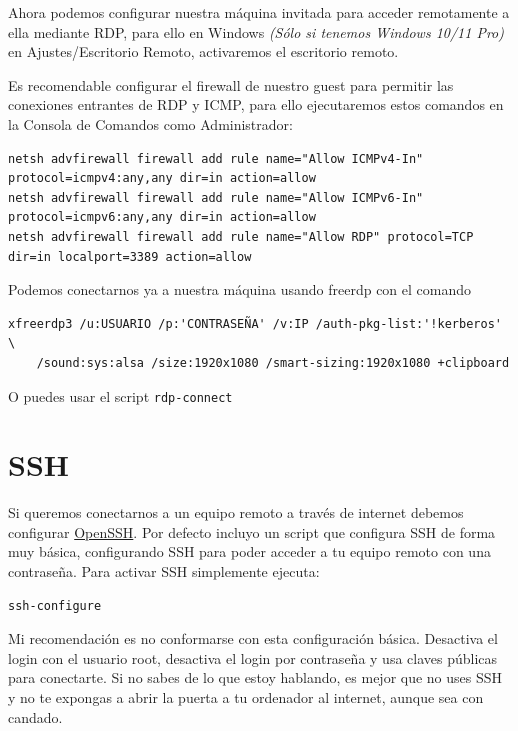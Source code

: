 \documentclass[11pt]{article}
\begin{document}
Ahora podemos configurar nuestra máquina invitada para acceder remotamente a ella mediante RDP, para ello en Windows \emph{(Sólo si tenemos Windows 10/11 Pro)} en Ajustes/Escritorio Remoto, activaremos el escritorio remoto.

Es recomendable configurar el firewall de nuestro guest para permitir las conexiones entrantes de RDP y ICMP, para ello ejecutaremos estos comandos en la Consola de Comandos como Administrador:

\begin{lstlisting}[basicstyle=\tiny\ttfamily]
netsh advfirewall firewall add rule name="Allow ICMPv4-In" protocol=icmpv4:any,any dir=in action=allow
netsh advfirewall firewall add rule name="Allow ICMPv6-In" protocol=icmpv6:any,any dir=in action=allow
netsh advfirewall firewall add rule name="Allow RDP" protocol=TCP dir=in localport=3389 action=allow
\end{lstlisting}

Podemos conectarnos ya a nuestra máquina usando freerdp con el comando

\begin{lstlisting}[basicstyle=\small\ttfamily]
xfreerdp3 /u:USUARIO /p:'CONTRASEÑA' /v:IP /auth-pkg-list:'!kerberos' \
	/sound:sys:alsa /size:1920x1080 /smart-sizing:1920x1080 +clipboard
\end{lstlisting}

O puedes usar el script \texttt{rdp-connect}

\section{SSH}

Si queremos conectarnos a un equipo remoto a través de internet debemos configurar \href{https://es.wikipedia.org/wiki/OpenSSH}{OpenSSH}. Por defecto incluyo un script que configura SSH de forma muy básica, configurando SSH para poder acceder a tu equipo remoto con una contraseña. Para activar SSH simplemente ejecuta:

\begin{verbatim}
ssh-configure
\end{verbatim}

Mi recomendación es no conformarse con esta configuración básica. Desactiva el login con el usuario root, desactiva el login por contraseña y usa claves públicas para conectarte. Si no sabes de lo que estoy hablando, es mejor que no uses SSH y no te expongas a abrir la puerta a tu ordenador al internet, aunque sea con candado.
\end{document}
